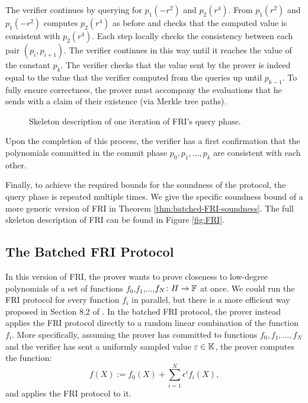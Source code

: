 The verifier continues by querying for $p_1(-r^2)$ and $p_2(r^4)$. From $p_1(r^2)$ and $p_1(-r^2)$ computes $p_2(r^4)$ as before and checks that the computed value is consistent with $p_2(r^4)$. Each step locally checks the consistency between each pair $(p_i,p_{i+1})$.
The verifier continues in this way until it reaches the value of the constant $p_k$. The verifier checks that the value sent by the prover is indeed equal to the value that the verifier computed from the queries up until $p_{k-1}$. To fully ensure correctness, the prover must accompany the evaluations that he sends with a claim of their existence (via Merkle tree paths). 

\begin{figure}[H]
\caption{Skeleton description of one iteration of FRI's query phase.}
\end{figure}
Upon the completion of this process, the verifier has a first confirmation that the polynomials committed in the commit phase $p_0,p_1,\dots,p_k$ are consistent with each other. 

Finally, to achieve the required bounds for the soundness of the protocol, the query phase is repeated multiple times. We give the specific soundness bound of a more generic version of FRI in Theorem \ref{thm:batched-FRI-soundness}. The full skeleton description of FRI can be found in Figure \ref{fig:FRI}.


\subsection*{The Batched FRI Protocol}

In this version of FRI, the prover wants to prove closeness to low-degree polynomials of a set of functions $f_0$,$f_1$,$\dots$,$f_N \colon H \to \mathbb{F}$ at once. We could run the FRI protocol for every function $f_i$ in parallel, but there is a more efficient way proposed in Section 8.2 of \cite{EPRINT:BCIKS20}. In the batched FRI protocol, the prover instead applies the FRI protocol directly to a random linear combination of the function $f_i$. More specifically, assuming the prover has committed to functions $f_0,f_1,\dots,f_N$ and the verifier has sent a uniformly sampled value $\varepsilon \in \mathbb{K}$, the prover computes the function:
\begin{equation}\label{eq:batched-FRI}
f(X) := f_0(X) + \sum_{i=1}^N \epsilon^i f_i(X),
\end{equation}
and applies the FRI protocol to it.

